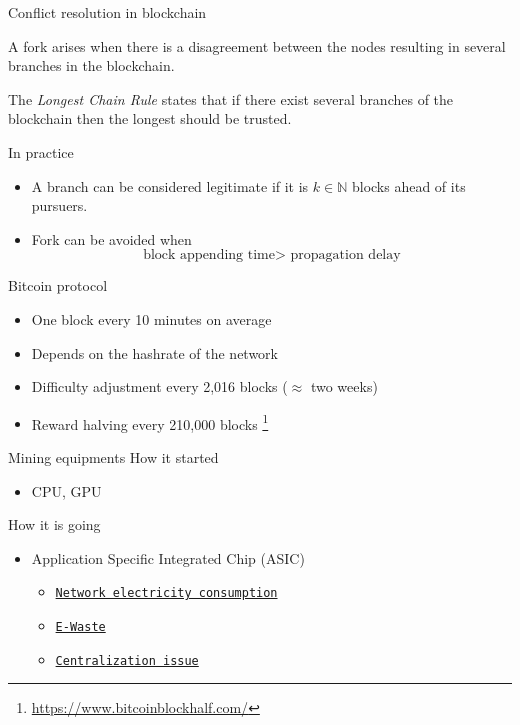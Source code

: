 \documentclass{beamer}
\newcommand\blfootnote[1]{%
  \begingroup
  \renewcommand\thefootnote{}\footnote{#1}%
  \addtocounter{footnote}{-1}%
  \endgroup
}
\begin{document}
\begin{frame}{Conflict resolution in blockchain}
\begin{tcolorbox}[enhanced,drop shadow, title=Fork]
    A fork arises when there is a disagreement between the nodes resulting in several branches in the blockchain.
\end{tcolorbox}
\begin{tcolorbox}[enhanced,drop shadow, title=LCR]
    The \textit{Longest Chain Rule} states that if there exist several branches of the blockchain then the longest should be trusted.
\end{tcolorbox}
In practice 
\begin{itemize}
  \item A branch can be considered legitimate if it is $k\in\mathbb{N}$ blocks ahead of its pursuers.
  \item Fork can be avoided when
  $$
  \text{block appending time}> \text{ propagation delay} 
  $$
\end{itemize}
\end{frame}
\begin{frame}{Bitcoin protocol}
\begin{itemize}
  \item One block every 10 minutes on average
  \item Depends on the hashrate of the network
  \item Difficulty adjustment every 2,016 blocks ($\approx$ two weeks)
  \item Reward halving every 210,000 blocks\blfootnote{\url{https://www.bitcoinblockhalf.com/}}
\end{itemize}

\end{frame}
\begin{frame}{Mining equipments}
How it started
\begin{itemize}
  \item CPU, GPU
\end{itemize}
How it is going
\begin{itemize}
  \item Application Specific Integrated Chip (ASIC)
  \begin{itemize}
  \item  \href{https://digiconomist.net/bitcoin-energy-consumption}{\texttt{Network electricity consumption}}
  \item  \href{https://www.bitmain.com/}{\texttt{E-Waste}}
  \item \href{https://mempool.space/graphs/mining/pools}{\texttt{Centralization issue}}
  \end{itemize}
\end{itemize}
\end{frame}
\end{document}
